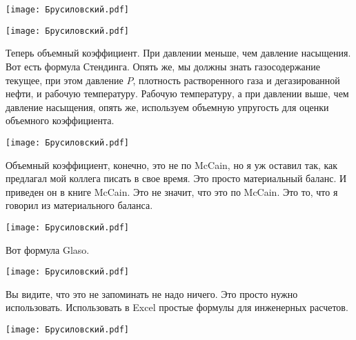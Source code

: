 \documentclass[main.tex]{subfiles}
\begin{document}
\begin{center}
\texttt{[image: Брусиловский.pdf]}
\end{center}



\begin{center}
\texttt{[image: Брусиловский.pdf]}
\end{center}

Теперь объемный коэффициент.
При давлении меньше, чем давление насыщения.
Вот есть формула Стендинга.
Опять же, мы должны знать газосодержание текущее, при этом давление $P$, плотность растворенного газа и дегазированной нефти, и рабочую температуру.
Рабочую температуру, а при давлении выше, чем давление насыщения, опять же, используем объемную упругость для оценки объемного коэффициента.

\begin{center}
\texttt{[image: Брусиловский.pdf]}
\end{center}

Объемный коэффициент, конечно, это не по McCain, но я уж оставил так, как предлагал мой коллега писать в свое время.
Это просто материальный баланс.
И приведен он в книге McCain.
Это не значит, что это по McCain.
Это то, что я говорил из материального баланса.

\begin{center}
\texttt{[image: Брусиловский.pdf]}
\end{center}

Вот формула Glaso.

\begin{center}
\texttt{[image: Брусиловский.pdf]}
\end{center}

Вы видите, что это не запоминать не надо ничего.
Это просто нужно использовать.
Использовать в Excel простые формулы для инженерных расчетов.

\begin{center}
\texttt{[image: Брусиловский.pdf]}
\end{center}
\end{document}
